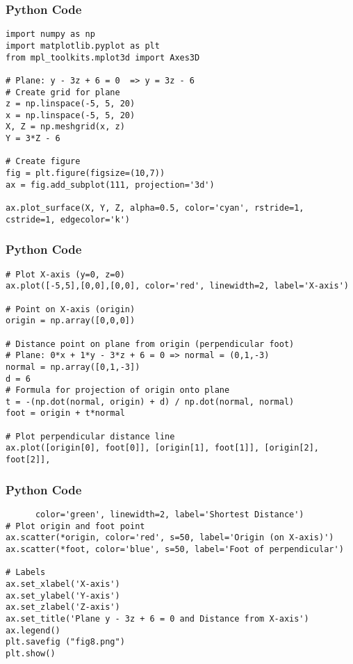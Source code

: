 \documentclass{beamer}
\begin{document}
\begin{frame}[fragile]
    \frametitle{Python Code}
    \begin{lstlisting}
import numpy as np
import matplotlib.pyplot as plt
from mpl_toolkits.mplot3d import Axes3D

# Plane: y - 3z + 6 = 0  => y = 3z - 6
# Create grid for plane
z = np.linspace(-5, 5, 20)
x = np.linspace(-5, 5, 20)
X, Z = np.meshgrid(x, z)
Y = 3*Z - 6

# Create figure
fig = plt.figure(figsize=(10,7))
ax = fig.add_subplot(111, projection='3d')

ax.plot_surface(X, Y, Z, alpha=0.5, color='cyan', rstride=1, cstride=1, edgecolor='k')
\end{lstlisting}
\end{frame}


\begin{frame}[fragile]
    \frametitle{Python Code}
    \begin{lstlisting}
# Plot X-axis (y=0, z=0)
ax.plot([-5,5],[0,0],[0,0], color='red', linewidth=2, label='X-axis')

# Point on X-axis (origin)
origin = np.array([0,0,0])

# Distance point on plane from origin (perpendicular foot)
# Plane: 0*x + 1*y - 3*z + 6 = 0 => normal = (0,1,-3)
normal = np.array([0,1,-3])
d = 6
# Formula for projection of origin onto plane
t = -(np.dot(normal, origin) + d) / np.dot(normal, normal)
foot = origin + t*normal

# Plot perpendicular distance line
ax.plot([origin[0], foot[0]], [origin[1], foot[1]], [origin[2], foot[2]],
\end{lstlisting}
\end{frame}


\begin{frame}[fragile]
    \frametitle{Python Code}
    \begin{lstlisting}
      color='green', linewidth=2, label='Shortest Distance')
# Plot origin and foot point
ax.scatter(*origin, color='red', s=50, label='Origin (on X-axis)')
ax.scatter(*foot, color='blue', s=50, label='Foot of perpendicular')

# Labels
ax.set_xlabel('X-axis')
ax.set_ylabel('Y-axis')
ax.set_zlabel('Z-axis')
ax.set_title('Plane y - 3z + 6 = 0 and Distance from X-axis')
ax.legend()
plt.savefig ("fig8.png") 
plt.show()
\end{lstlisting}
\end{frame}
\end{document}
